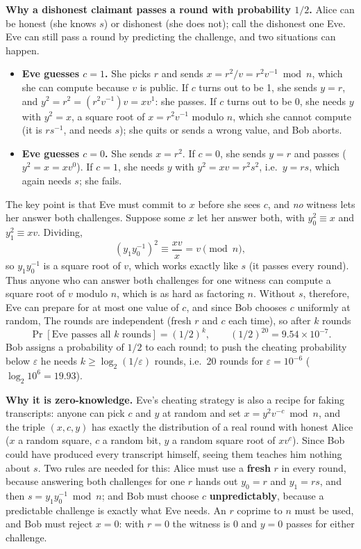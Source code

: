 \textbf{Why a dishonest claimant passes a round with probability $1/2$.} Alice can be honest (she knows $s$) or dishonest (she does not); call the dishonest one Eve. Eve can still pass a round by predicting the challenge, and two situations can happen.
\begin{itemize}
  \item \textbf{Eve guesses $c = 1$.} She picks $r$ and sends $x = r^2 / v = r^2 v^{-1} \bmod n$, which she can compute because $v$ is public. If $c$ turns out to be 1, she sends $y = r$, and $y^2 = r^2 = (r^2 v^{-1}) v = x v^1$: she passes. If $c$ turns out to be 0, she needs $y$ with $y^2 = x$, a square root of $x = r^2 v^{-1}$ modulo $n$, which she cannot compute (it is $r s^{-1}$, and needs $s$); she quits or sends a wrong value, and Bob aborts.
  \item \textbf{Eve guesses $c = 0$.} She sends $x = r^2$. If $c = 0$, she sends $y = r$ and passes ($y^2 = x = x v^0$). If $c = 1$, she needs $y$ with $y^2 = x v = r^2 s^2$, i.e.\ $y = rs$, which again needs $s$; she fails.
\end{itemize}
The key point is that Eve must commit to $x$ before she sees $c$, and \emph{no} witness lets her answer both challenges. Suppose some $x$ let her answer both, with $y_0^2 \equiv x$ and $y_1^2 \equiv x v$. Dividing,
\[
(y_1 y_0^{-1})^2 \equiv \frac{x v}{x} = v \pmod n ,
\]
so $y_1 y_0^{-1}$ is a square root of $v$, which works exactly like $s$ (it passes every round). Thus anyone who can answer both challenges for one witness can compute a square root of $v$ modulo $n$, which is as hard as factoring $n$. Without $s$, therefore, Eve can prepare for at most one value of $c$, and since Bob chooses $c$ uniformly at random,  The rounds are independent (fresh $r$ and $c$ each time), so after $k$ rounds
\[
\Pr[\text{Eve passes all } k \text{ rounds}] = (1/2)^k , \qquad (1/2)^{20} = 9.54 \times 10^{-7}.
\]
Bob assigns a probability of $1/2$ to each round; to push the cheating probability below $\varepsilon$ he needs $k \ge \log_2(1/\varepsilon)$ rounds, i.e.\ 20 rounds for $\varepsilon = 10^{-6}$ ($\log_2 10^6 = 19.93$).

\textbf{Why it is zero-knowledge.} Eve's cheating strategy is also a recipe for faking transcripts: anyone can pick $c$ and $y$ at random and set $x = y^2 v^{-c} \bmod n$, and the triple $(x, c, y)$ has exactly the distribution of a real round with honest Alice ($x$ a random square, $c$ a random bit, $y$ a random square root of $x v^c$). Since Bob could have produced every transcript himself, seeing them teaches him nothing about $s$. Two rules are needed for this: Alice must use a \textbf{fresh} $r$ in every round, because answering both challenges for one $r$ hands out $y_0 = r$ and $y_1 = rs$, and then $s = y_1 y_0^{-1} \bmod n$; and Bob must choose $c$ \textbf{unpredictably}, because a predictable challenge is exactly what Eve needs. An $r$ coprime to $n$ must be used, and Bob must reject $x = 0$: with $r = 0$ the witness is 0 and $y = 0$ passes for either challenge.

